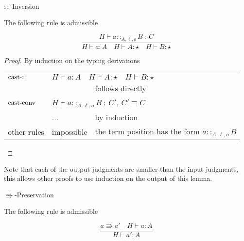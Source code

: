 \begin{lem}
$::$-Inversion

The following rule is admissible
\end{lem}

\[
\frac{H\vdash a::_{A,\ensuremath{\ell},o}B\::\:C}{H\vdash a:A\quad H\vdash A:\star\quad H\vdash B:\star}
\]

\begin{proof}
By induction on the typing derivations

\begin{tabular}{lll}
$\operatorname{cast-::}$ & \multicolumn{2}{l}{$H\vdash a:A\quad H\vdash A:\star\quad H\vdash B:\star$}\tabularnewline
 &  & follows directly\tabularnewline
$\operatorname{cast-conv}$ & \multicolumn{2}{l}{$H\vdash a::_{A,\ensuremath{\ell},o}B\::\:C'$, $C'\equiv C$}\tabularnewline
 & ... & by induction\tabularnewline
other rules & impossible & the term position has the form $a::_{A,\ensuremath{\ell},o}B$\tabularnewline
\end{tabular}
\end{proof}
Note that each of the output judgments are smaller than the input judgments, this allows other proofs to use induction on the output of this lemma.
\begin{thm}
$\Rrightarrow$-Preservation 

The following rule is admissible

\[
\frac{a\Rrightarrow a'\quad H\vdash a:A}{H\vdash a':A}
\]
\end{thm}

